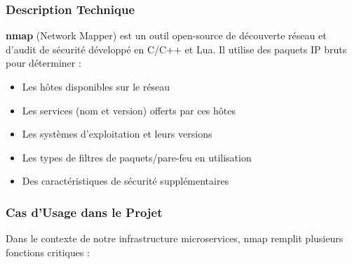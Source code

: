 \subsubsection{Description Technique}
\textbf{nmap} (Network Mapper) est un outil open-source de découverte réseau et d'audit de sécurité développé en C/C++ et Lua. Il utilise des paquets IP bruts pour déterminer :
\begin{itemize}
    \item Les hôtes disponibles sur le réseau
    \item Les services (nom et version) offerts par ces hôtes
    \item Les systèmes d'exploitation et leurs versions
    \item Les types de filtres de paquets/pare-feu en utilisation
    \item Des caractéristiques de sécurité supplémentaires
\end{itemize}

\subsubsection{Cas d'Usage dans le Projet}
Dans le contexte de notre infrastructure microservices, nmap remplit plusieurs fonctions critiques :

